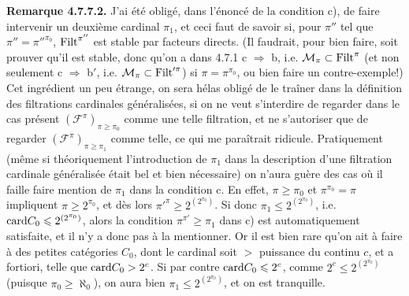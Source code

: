 \noindent{}\textbf{Remarque 4.7.7.2.} J'ai été obligé, dans l'énoncé de la condition c), de faire intervenir un deuxième cardinal $\pi_1$, et ceci faut de savoir si, pour $\pi''$ tel que $\pi''=\pi''^{\pi_0}$, $\mathrm{Filt}^{\pi''}$ est stable par facteurs directs. (Il faudrait, pour bien faire, soit prouver qu'il est stable, donc qu'on a dans 4.7.1 c $\Longrightarrow$ b, i.e. $\mathcal{M}_\pi\subset\mathrm{Filt}^{\pi}$ (et non seulement c $\Longrightarrow$ b$'$, i.e. $\mathcal{M}_\pi\subset\mathrm{Filt}'^{\pi}$) si $\pi=\pi^{\pi_0}$, ou bien faire un contre-exemple!) Cet ingrédient un peu étrange, on sera hélas obligé de le traîner dans la définition des filtrations cardinales généralisées, si on ne veut s'interdire de regarder dans le cas présent $(\mathcal{F}^{\pi})_{\pi\geqslant\pi_0}$ comme une telle filtration, et ne s'autoriser que de regarder $(\mathcal{F}^{\pi})_{\pi\geqslant\pi_1}$ comme telle, ce qui me paraîtrait ridicule. Pratiquement (même si théoriquement l'introduction de $\pi_1$ dans la description d'une filtration cardinale généralisée était bel et bien nécessaire) on n'aura guère des cas où il faille faire mention de $\pi_1$ dans la condition c. En effet, $\pi\geqslant\pi_0$ et $\pi^{\pi_0}=\pi$ impliquent $\pi\geqslant 2^{\pi_0}$, et dès lors $\pi'^{\pi}\geqslant 2^{(2^{\pi_0})}$. Si donc $\pi_1\leqslant 2^{(2^{\pi_0})}$, i.e. $\mathrm{card} C_0\leqslant 2^{(2^{\pi_0})}$, alors la condition $\pi^{\pi'}\geqslant\pi_1$ dans c) est automatiquement satisfaite, et il n'y a donc pas à la mentionner. Or il est bien rare qu'on ait à faire à des petites catégories $C_0$, dont le cardinal soit $>$ puissance %
du continu $c$, et a fortiori, telle que $\mathrm{card} C_0 > 2^{c}$. Si par contre $\mathrm{card} C_0\leqslant 2^{c}$, comme $2^{c}\leqslant 2^{(2^{\pi_0})}$ (puisque $\pi_0\geqslant\aleph_0$), on aura bien $\pi_1\leqslant 2^{(2^{\pi_0})}$, et on est tranquille.

